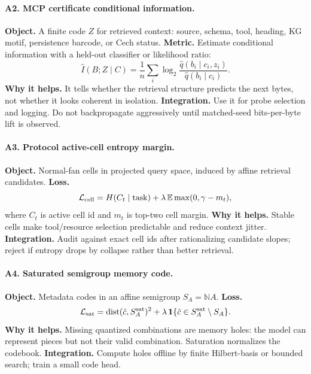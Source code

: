 \documentclass[11pt]{article}
\newcommand{\NN}{\mathbb{N}}
\newcommand{\loss}{\mathcal{L}}
\numberwithin{equation}{section}
\begin{document}
\paragraph{A2. MCP certificate conditional information.}
\textbf{Object.} A finite code $Z$ for retrieved context: source, schema, tool, heading, KG motif, persistence barcode, or Cech status. \textbf{Metric.} Estimate conditional information with a held-out classifier or likelihood ratio:
\begin{equation}
\widehat I(B;Z\mid C)=\frac1n\sum_i \log_2\frac{\hat q(b_i\mid c_i,z_i)}{\hat q(b_i\mid c_i)}.
\end{equation}
\textbf{Why it helps.} It tells whether the retrieval structure predicts the next bytes, not whether it looks coherent in isolation. \textbf{Integration.} Use it for probe selection and logging. Do not backpropagate aggressively until matched-seed bits-per-byte lift is observed.

\paragraph{A3. Protocol active-cell entropy margin.}
\textbf{Object.} Normal-fan cells in projected query space, induced by affine retrieval candidates. \textbf{Loss.}
\begin{equation}
\loss_{\rm cell}=H(C_t\mid \mathrm{task})+\lambda\,\mathbb E\max(0,\gamma-m_t),
\end{equation}
where $C_t$ is active cell id and $m_t$ is top-two cell margin. \textbf{Why it helps.} Stable cells make tool/resource selection predictable and reduce context jitter. \textbf{Integration.} Audit against exact cell ids after rationalizing candidate slopes; reject if entropy drops by collapse rather than better retrieval.

\paragraph{A4. Saturated semigroup memory code.}
\textbf{Object.} Metadata codes in an affine semigroup $S_A=\NN A$. \textbf{Loss.}
\begin{equation}
\loss_{\rm sat}=\operatorname{dist}(\hat c,S_A^{\rm sat})^2+\lambda\,\mathbf{1}\{\hat c\in S_A^{\rm sat}\setminus S_A\}.
\end{equation}
\textbf{Why it helps.} Missing quantized combinations are memory holes: the model can represent pieces but not their valid combination. Saturation normalizes the codebook. \textbf{Integration.} Compute holes offline by finite Hilbert-basis or bounded search; train a small code head.
\end{document}
